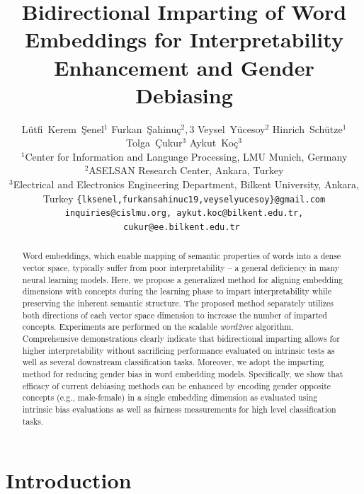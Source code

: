 \documentclass[11pt,a4paper]{article}
\title{Bidirectional Imparting of Word Embeddings for Interpretability Enhancement and Gender Debiasing}
\author{Lütfi~Kerem~Şenel$^1$ \And Furkan~Şahinuç$^2,3$ \And Veysel~Yücesoy$^2$ \And Hinrich~Schütze$^1$ \And Tolga~Çukur$^3$ \And Aykut~Koç$^3$\\
  $^1$Center for Information and Language Processing, LMU Munich, Germany \\
  $^2$ASELSAN Research Center, Ankara, Turkey \\
  $^3$Electrical and Electronics Engineering Department, Bilkent University, Ankara, Turkey
  \texttt{\{lksenel,furkansahinuc19,veyselyucesoy\}@gmail.com}\\
  \texttt{inquiries@cislmu.org, aykut.koc@bilkent.edu.tr, cukur@ee.bilkent.edu.tr } \\}
\date{}
\begin{document}
\maketitle
\begin{abstract}
Word embeddings, which enable mapping of semantic properties of words into a dense vector space, typically suffer from poor interpretability -- a general deficiency in many neural learning models. 
Here, we propose a generalized method for aligning embedding dimensions with concepts during the learning phase to impart interpretability while preserving the inherent semantic structure. 
The proposed method separately utilizes both directions of each vector space dimension to increase the number of imparted concepts.
Experiments are performed on the scalable \textit{word2vec} algorithm.
Comprehensive demonstrations clearly indicate that bidirectional imparting allows for higher interpretability without sacrificing performance evaluated on intrinsic tests as well as several downstream classification tasks.
Moreover, we adopt the imparting method for reducing gender bias in word embedding models. Specifically, we show that efficacy of current debiasing methods can be enhanced by encoding gender opposite concepts (e.g., male-female) in a single embedding dimension as evaluated using intrinsic bias evaluations as well as fairness measurements for high level classification tasks.
\end{abstract}

\section{Introduction}\label{sec:intro}
\end{document}
